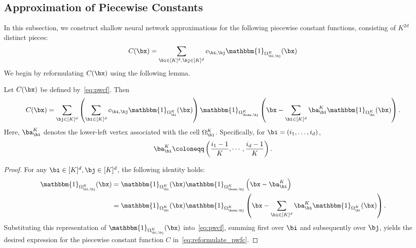 \documentclass[11pt]{article}
\begin{document}
\subsection{Approximation of Piecewise Constants}
\label{subsec:app_pwcf}
In this subsection, we construct shallow neural network approximations for the following piecewise constant functions, consisting of $K^{2d}$ distinct pieces:
\begin{equation}
    C(\bx) = \sum_{\bi \in [K]^d, \bj \in [K]^d} c_{\bi, \bj} \mathbbm{1}_{\Omega^{K}_{\bi, \bj}} (\bx)
    \label{eq:pwcf}
\end{equation}
We begin by reformulating $C(\bx)$ using the following lemma. 
\begin{lemma}
    Let $C(\bx)$ be defined by~\eqref{eq:pwcf}. Then 
    \begin{equation}
        C(\bx) =\sum_{\bj \in [K]^d} \left( \sum_{\bi \in [K]^d} c_{\bi, \bj} \mathbbm{1}_{\Omega_{\bi}^K}(\bx) \right) \mathbbm{1}_{\Omega_{\bone, \bj}^{ K}} \left(\bx - \sum_{\bi \in [K]^d} \ba_{\bi}^K  \mathbbm{1}_{\Omega_{\bi}^K}(\bx)\right).
        \label{eq:reformulate_pwfc}
    \end{equation}
    Here, $\ba_{\bi}^K$ denotes the lower-left vertex associated with the cell $\Omega_{\bi}^K$. Specifically, for $\bi = (i_1,\ldots,i_d)$,
    \begin{equation*}
        \ba_{\bi}^{K} \coloneqq  \left( \frac{i_1 -1}{K}, \cdots, \frac{i_d -1}{K}\right) .
    \end{equation*}
    \label{lem:reformulat_pwfc}
\end{lemma}
\begin{proof}
    For any $\bi \in [K]^d, \bj \in [K]^d$, the following identity holds:
    \begin{equation*}
        \begin{aligned}
            \mathbbm{1}_{\Omega_{\bi, \bj}^K} (\bx) & = \mathbbm{1}_{\Omega_{\bi}^K} (\bx) \mathbbm{1}_{\Omega_{\bone, \bj}^{ K}} \left(\bx - \ba_{\bi}^K \right) \\
            & = \mathbbm{1}_{\Omega_{\bi}^K}(\bx)\mathbbm{1}_{\Omega_{\bone, \bj}^{ K}} \left(\bx - \sum_{\bi \in [K]^d} \ba_{\bi}^K  \mathbbm{1}_{\Omega_{\bi}^K} (\bx)\right).
        \end{aligned}
    \end{equation*}
    Substituting this representation of $\mathbbm{1}_{\Omega_{\bi,\bj}^K} (\bx )$ into~\eqref{eq:pwcf}, summing first over $\bi$ and subsequently over $\bj$, yields the desired expression for the piecewise constant function $C$ in~\eqref{eq:reformulate_pwfc}.
\end{proof}
\end{document}
